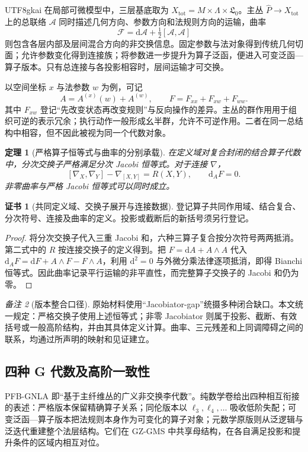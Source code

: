 \documentclass[11pt,a4paper]{article}
\theoremstyle{plain}
\newtheorem{theorem}{定理}[section]
\theoremstyle{definition}
\newtheorem*{certificate}{证书}
\theoremstyle{remark}
\newtheorem{remark}[theorem]{备注}
\begin{document}
\begin{CJK*}{UTF8}{gkai}
在局部可微模型中，三层基底取为 $X_{\mathrm{tot}}=M\times\Lambda\times\mathfrak L_0$。主丛 $\widehat P\to X_{\mathrm{tot}}$ 上的总联络 $\mathcal A$ 同时描述几何方向、参数方向和法规则方向的运输，曲率
\[
 \mathcal F=\mathrm d\mathcal A+\tfrac12[\mathcal A,\mathcal A]
\]
则包含各层内部及层间混合方向的非交换信息。固定参数与法对象得到传统几何切面；允许参数变化得到连接族；将参数进一步提升为算子泛函，便进入可变泛函—算子版本。只有总连接与各投影相容时，层间运输才可交换。\cite{S01,S05}

以空间坐标 $x$ 与法参数 $w$ 为例，可记
\[
 A=A^{(x)}(w)+A^{(w)},\qquad
 F=F_{xx}+F_{xw}+F_{ww}.
\]
其中 $F_{xw}$ 登记“先改变状态再改变规则”与反向操作的差异。主丛的群作用用于组织可逆的表示冗余；执行动作一般形成幺半群，允许不可逆作用。二者在同一总结构中相容，但不因此被视为同一个代数对象。

\begin{theorem}[严格算子恒等式与曲率的分别承载]
\label{fa:thm-strict}
在定义域对复合封闭的结合算子代数中，分次交换子严格满足分次 Jacobi 恒等式。对于连接 $\nabla$，
\[
 [\nabla_X,\nabla_Y]-\nabla_{[X,Y]}=R(X,Y),\qquad
 \mathrm d_A F=0.
\]
非零曲率与严格 Jacobi 恒等式可以同时成立。
\end{theorem}
\begin{certificate}[共同定义域、交换子展开与连接数据]
登记算子共同作用域、结合复合、分次符号、连接及曲率的定义。投影或截断后的新括号须另行登记。
\end{certificate}
\begin{proof}
将分次交换子代入三重 Jacobi 和，六种三算子复合按分次符号两两抵消。第二式中的 $R$ 按连接交换子的定义得到。把 $F=\mathrm dA+A\wedge A$ 代入 $\mathrm d_AF=\mathrm dF+A\wedge F-F\wedge A$，利用 $\mathrm d^2=0$ 与外微分乘法律逐项抵消，即得 Bianchi 恒等式。因此曲率记录平行运输的非平直性，而完整算子交换子的 Jacobi 和仍为零。
\end{proof}

\begin{remark}[版本整合口径]
原始材料使用“Jacobiator-gap”统摄多种闭合缺口。本文统一规定：严格交换子使用上述恒等式；非零 Jacobiator 则属于投影、截断、有效括号或一般高阶结构，并由其具体定义计算。曲率、三元残差和上同调障碍之间的联系，均通过所声明的映射和见证建立。
\end{remark}

\subsection{四种 G 代数及高阶一致性}

PFB-GNLA 即“基于主纤维丛的广义非交换李代数”。纯数学卷给出四种相互衔接的表述：严格版本保留精确算子关系；同伦版本以 $\ell_3,\ell_4,\ldots$ 吸收低阶失配；可变泛函—算子版本把法规则本身作为可变化的算子对象；元数学原版则从泛逻辑与泛迭代重建整个法层结构。它们在 GZ-GMS 中共享母结构，在各自满足投影和提升条件的区域内相互对位。\cite{S01,S07,S09}


\end{CJK*}
\end{document}

